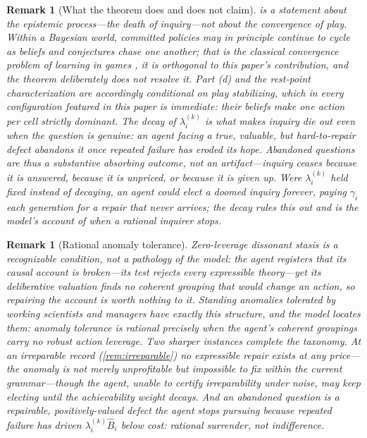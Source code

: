 \documentclass[11pt]{article}
\newtheorem{remark}[assumption]{Remark}
\theoremstyle{definition}
\begin{document}
\begin{remark}[What the theorem does and does not claim]
\label{rem:scope}
 is a statement about the epistemic process---the death
of inquiry---not about the convergence of play.  Within a Bayesian world,
committed policies may in principle continue to cycle as beliefs and
conjectures chase one another; that is the classical convergence problem of
learning in games \citep{FudenbergLevine1993,KalaiLehrer1993a}, it is
orthogonal to this paper's contribution, and the theorem deliberately does not
resolve it.  Part (d) and the rest-point characterization are accordingly
conditional on play stabilizing, which in every configuration featured in this
paper is immediate: their beliefs make one action per cell strictly dominant.
The decay of $\lambda_i^{(k)}$ is what makes inquiry die out even when the
question is genuine: an agent facing a true, valuable, but hard-to-repair
defect abandons it once repeated failure has eroded its hope.  Abandoned
questions are thus a substantive absorbing outcome, not an artifact---inquiry
ceases because it is answered, because it is unpriced, or because it is given
up.  Were $\lambda_i^{(k)}$ held fixed instead of decaying, an agent could
elect a doomed inquiry forever, paying $\gamma_i$ each generation for a repair
that never arrives; the decay rules this out and is the model's account of
when a rational inquirer stops.
\end{remark}

\begin{remark}[Rational anomaly tolerance]
\label{rem:anomaly}
Zero-leverage dissonant stasis is a recognizable condition, not a pathology
of the model: the agent registers that its causal account is broken---its test
rejects every expressible theory---yet its deliberative valuation finds no
coherent grouping that would change an action, so repairing the account is
worth nothing to it.  Standing anomalies tolerated by working scientists and
managers have exactly this structure, and the model locates them: anomaly
tolerance is rational precisely when the agent's coherent groupings carry no
robust action leverage.  Two sharper instances complete the taxonomy.  At an
irreparable record (\cref{rem:irreparable}) no expressible repair exists at
any price---the anomaly is not merely unprofitable but impossible to fix
within the current grammar---though the agent, unable to certify
irreparability under noise, may keep electing until the achievability weight
decays.  And an \emph{abandoned question} is a repairable, positively-valued
defect the agent stops pursuing because repeated failure has driven
$\lambda_i^{(k)}\widehat B_i$ below cost: rational surrender, not
indifference.
\end{remark}
\end{document}
